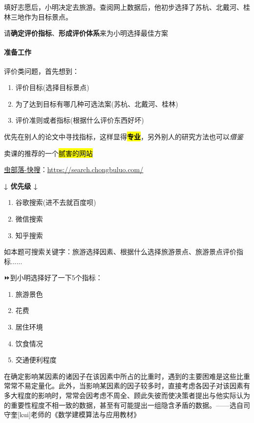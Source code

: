 \documentclass[
]{article}
\begin{document}
填好志愿后，小明决定去旅游。查阅网上数据后，他初步选择了苏杭、北戴河、桂林三地作为目标景点。

请\textbf{确定评价指标}、\textbf{形成评价体系}来为小明选择最佳方案

\hypertarget{ux51c6ux5907ux5de5ux4f5c}{%
\paragraph{准备工作}\label{ux51c6ux5907ux5de5ux4f5c}}

评价类问题，首先想到：

\begin{enumerate}
\def\labelenumi{\arabic{enumi}.}
\item
  评价目标(选择目标景点)
\item
  为了达到目标有哪几种可选法案(苏杭、北戴河、桂林)
\item
  评价准则或者指标(根据什么评价东西好坏)
\end{enumerate}

优先在别人的论文中寻找指标，这样显得\hl{\textbf{专业}}，另外别人的研究方法也可以\emph{借鉴}

卖课的推荐的一个\hl{腻害的网站}

\href{https://search.chongbuluo.com/}{虫部落-快搜}：\url{https://search.chongbuluo.com/}

\textbf{↓ 优先级 ↓}

\begin{enumerate}
\def\labelenumi{\arabic{enumi}.}
\item
  谷歌搜索(进不去就百度呗)
\item
  微信搜索
\item
  知乎搜索
\end{enumerate}

如本题可搜索关键字：旅游选择因素、根据什么选择旅游景点、旅游景点评价指标......

⏩到小明选择好了一下5个指标：

\begin{enumerate}
\def\labelenumi{\arabic{enumi}.}
\item
  旅游景色
\item
  花费
\item
  居住环境
\item
  饮食情况
\item
  交通便利程度
\end{enumerate}

在确定影响某因素的诸因子在该因素中所占的比重时，遇到的主要困难是这些比重常常不易定量化。此外，当影响某因素的因子较多时，直接考虑各因子对该因素有多大程度的影响时，常常会因考虑不周全、顾此失彼而使决策者提出与他实际认为的重要性程度不相一致的数据，甚至有可能提出一组隐含矛盾的数据。------选自司守奎{[}kui{]}老师的《数学建模算法与应用教材》
\end{document}
